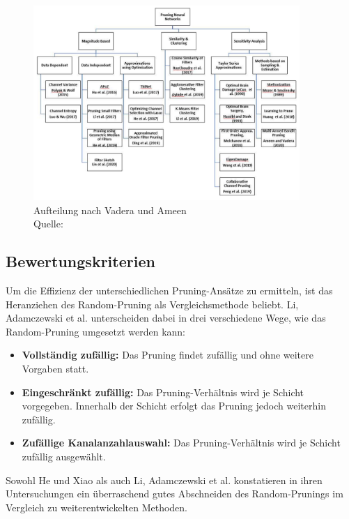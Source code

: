 \begin{figure}[H]
	\centering
	\includegraphics[width=0.9\textwidth]{images/pruning.png}
    \caption[Pruning-Methoden nach Vadera und Ameen]{Aufteilung nach Vadera und Ameen\\Quelle: \cite{vadera2022methods}}
	\label{fig:vadera}
\end{figure}


\newpage
\subsection{Bewertungskriterien}

Um die Effizienz der unterschiedlichen Pruning-Ansätze zu ermitteln, ist das
Heranziehen des Random-Pruning als Vergleichsmethode beliebt. Li, Adamczewski
et al. unterscheiden dabei in drei verschiedene Wege, wie das Random-Pruning
umgesetzt werden kann:

\begin{itemize}
	\item \textbf{Vollständig zufällig:} Das Pruning findet zufällig und ohne weitere Vorgaben statt.
	\item \textbf{Eingeschränkt zufällig:} Das Pruning-Verhältnis wird je Schicht vorgegeben. Innerhalb der Schicht erfolgt das Pruning jedoch weiterhin zufällig.
    \item \textbf{Zufällige Kanalanzahlauswahl:} Das Pruning-Verhältnis wird je Schicht zufällig ausgewählt.\autocite[Vgl.][]{li2022random}
\end{itemize}

Sowohl He und Xiao als auch Li, Adamczewski et al. konstatieren in ihren
Untersuchungen ein überraschend gutes Abschneiden des Random-Prunings im
Vergleich zu weiterentwickelten Methoden.\autocites[Vgl.][]{he2023structured}{li2022random}

